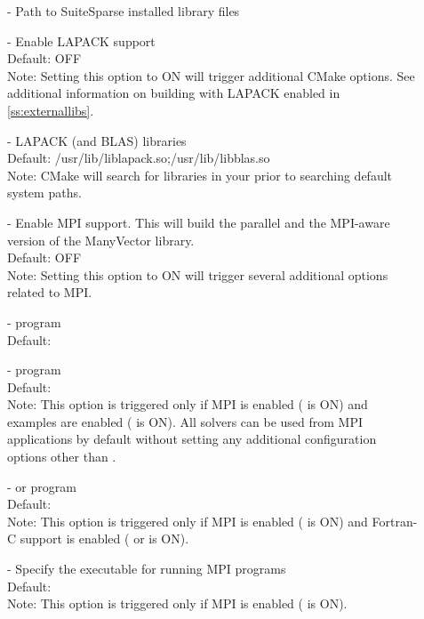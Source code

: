 \begin{description}
\item[] -
  Path to SuiteSparse installed library files
\item[] -
  Enable LAPACK support
  \\
  Default: OFF
  \\
  Note: Setting this option to ON will trigger additional CMake
  options. See additional information on building with LAPACK enabled
  in \ref{ss:externallibs}.
\item[] -
  LAPACK (and BLAS) libraries
  \\
  Default: /usr/lib/liblapack.so;/usr/lib/libblas.so
  \\
  Note: CMake will search for libraries in your  prior
  to searching default system paths.
\item[] -
  Enable MPI support. This will build the parallel {\nvector} and the
  MPI-aware version of the ManyVector library.
  \\
  Default: OFF
  \\
  Note: Setting this option to ON will trigger several additional options
  related to MPI.
\item[] -
   program
  \\
  Default:
\item[] -
   program
  \\
  Default:
  \\
  Note: This option is triggered only if MPI is enabled
  ( is ON) and {\CPP} examples are enabled
  ( is ON). All {\sundials}
  solvers can be used from {\CPP} MPI applications by default
  without setting any additional configuration options other than
  .
\item[] -
   or  program
  \\
  Default:
  \\
  Note: This option is triggered only if MPI is enabled
  ( is ON) and Fortran-C support is enabled
  ( or  is ON).
\item[] -
  Specify the executable for running MPI programs
  \\
  Default: 
  \\
  Note: This option is triggered only if MPI is enabled
  ( is ON).

\end{description}
